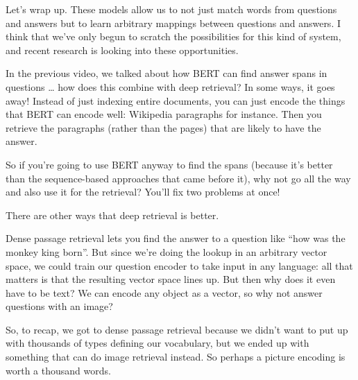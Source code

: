 Let’s wrap up.  These models allow us to not just match words from questions and answers but to learn arbitrary mappings between questions and answers.  I think that we’ve only begun to scratch the possibilities for this kind of system, and recent research is looking into these opportunities.  

In the previous video, we talked about how BERT can find answer spans in questions … how does this combine with deep retrieval?  In some ways, it goes away!  Instead of just indexing entire documents, you can just encode the things that BERT can encode well: Wikipedia paragraphs for instance.  Then you retrieve the paragraphs (rather than the pages) that are likely to have the answer.

So if you’re going to use BERT anyway to find the spans (because it’s better than the sequence-based approaches that came before it), why not go all the way and also use it for the retrieval?  You’ll fix two problems at once!

There are other ways that deep retrieval is better.

Dense passage retrieval lets you find the answer to a question like “how was the monkey king born”.  But since we’re doing the lookup in an arbitrary vector space, we could train our question encoder to take input in any language: all that matters is that the resulting vector space lines up.  But then why does it even have to be text?  We can encode any object as a vector, so why not answer questions with an image?

So, to recap, we got to dense passage retrieval because we didn’t want to put up with thousands of types defining our vocabulary, but we ended up with something that can do image retrieval instead.  So perhaps a picture encoding is worth a thousand words.
